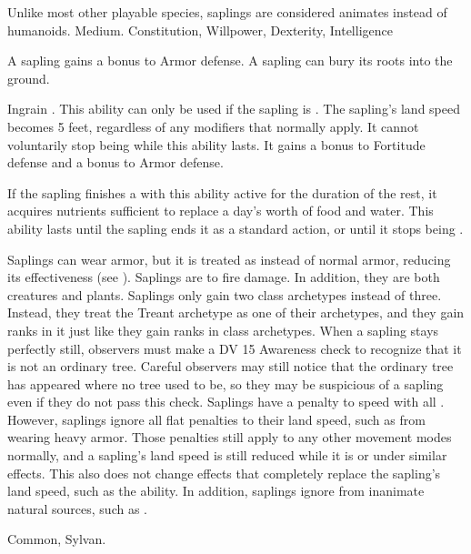  Unlike most other playable species, saplings are considered animates instead of humanoids.
 Medium.
  Constitution,  Willpower,  Dexterity,  Intelligence
\begin{itemize}
	 A sapling gains a  bonus to Armor defense.
	 A sapling can bury its roots into the ground.
	      \begin{activeability}{Ingrain}
		      \abilityusagetime {}.
		      \rankline
		      This ability can only be used if the sapling is .
		      The sapling's land speed becomes 5 feet, regardless of any modifiers that normally apply.
		      It cannot voluntarily stop being  while this ability lasts.
		      It gains a  bonus to Fortitude defense and a  bonus to Armor defense.

		      If the sapling finishes a  with this ability active for the duration of the rest, it acquires nutrients sufficient to replace a day's worth of food and water.
		      This ability lasts until the sapling ends it as a standard action, or until it stops being .
	      \end{activeability}
	 Saplings can wear armor, but it is treated as  instead of normal armor, reducing its effectiveness (see ).
	 Saplings are \vulnerable to fire damage. In addition, they are both creatures and plants.
	 Saplings only gain two class archetypes instead of three.
	      Instead, they treat the Treant archetype as one of their archetypes, and they gain ranks in it just like they gain ranks in class archetypes.
	 When a sapling stays perfectly still, observers must make a DV 15 Awareness check to recognize that it is not an ordinary tree.
	      Careful observers may still notice that the ordinary tree has appeared where no tree used to be, so they may be suspicious of a sapling even if they do not pass this check.
	 Saplings have a  penalty to speed with all .
	      However, saplings ignore all flat penalties to their land speed, such as from wearing heavy armor.
	      Those penalties still apply to any other movement modes normally, and a sapling's land speed is still reduced while it is \slowed or under similar effects.
	      This also does not change effects that completely replace the sapling's land speed, such as the  ability.
	      In addition, saplings ignore  from inanimate natural sources, such as .
\end{itemize}
 Common, Sylvan.


